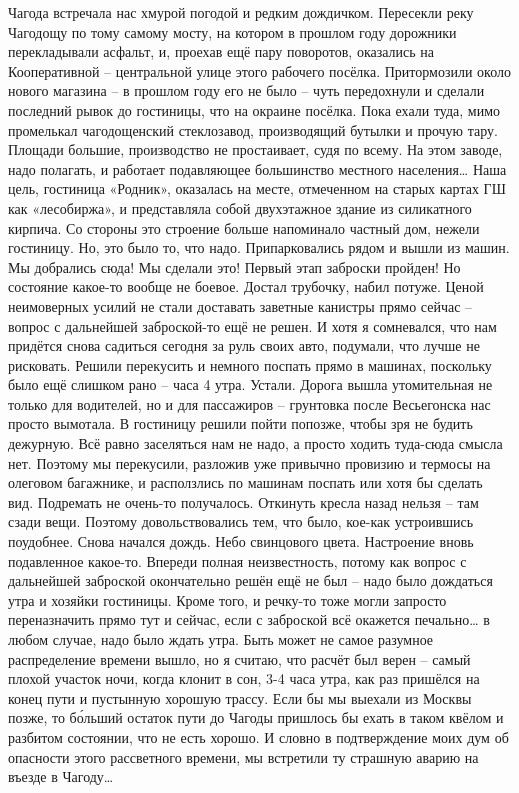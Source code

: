 Чагода встречала нас хмурой погодой и редким дождичком. Пересекли реку Чагодощу по тому самому мосту, на котором в прошлом году дорожники перекладывали асфальт, и, проехав ещё пару поворотов, оказались на Кооперативной – центральной улице этого рабочего посёлка. Притормозили около нового магазина – в прошлом году его не было – чуть передохнули и сделали последний рывок до гостиницы, что на окраине посёлка. Пока ехали туда, мимо промелькал чагодощенский стеклозавод, производящий бутылки и прочую тару. Площади большие, производство не простаивает, судя по всему. На этом заводе, надо полагать, и работает подавляющее большинство местного населения…
Наша цель, гостиница «Родник», оказалась на месте, отмеченном на старых картах ГШ как «лесобиржа», и представляла собой двухэтажное здание из силикатного кирпича. Со стороны это строение больше напоминало частный дом, нежели гостиницу. Но, это было то, что надо. Припарковались рядом и вышли из машин. Мы добрались сюда! Мы сделали это! Первый этап заброски пройден! Но состояние какое-то вообще не боевое. Достал трубочку, набил потуже. Ценой неимоверных усилий не стали доставать заветные канистры прямо сейчас – вопрос с дальнейшей заброской-то ещё не решен. И хотя я сомневался, что нам придётся снова садиться сегодня за руль своих авто, подумали, что лучше не рисковать. Решили перекусить и немного поспать прямо в машинах, поскольку было ещё слишком рано – часа 4 утра. Устали. Дорога вышла утомительная не только для водителей, но и для пассажиров – грунтовка после Весьегонска нас просто вымотала. В гостиницу решили пойти попозже, чтобы зря не будить дежурную. Всё равно заселяться нам не надо, а просто ходить туда-сюда смысла нет. Поэтому мы перекусили, разложив уже привычно провизию и термосы на олеговом багажнике, и расползлись по машинам поспать или хотя бы сделать вид. 
Подремать не очень-то получалось. Откинуть кресла назад нельзя – там сзади вещи. Поэтому довольствовались тем, что было, кое-как устроившись поудобнее. Снова начался дождь. Небо свинцового цвета. Настроение вновь подавленное какое-то. Впереди полная неизвестность, потому как вопрос с дальнейшей заброской окончательно решён ещё не был – надо было дождаться утра и хозяйки гостиницы. Кроме того, и речку-то тоже могли запросто переназначить прямо тут и сейчас, если с заброской всё окажется печально… в любом случае, надо было ждать утра. Быть может не самое разумное распределение времени вышло, но я считаю, что расчёт был верен – самый плохой участок ночи, когда клонит в сон, 3-4 часа утра, как раз пришёлся на конец пути и пустынную хорошую трассу. Если бы мы выехали из Москвы позже, то б\'{о}льший остаток пути до Чагоды пришлось бы ехать в таком квёлом и разбитом состоянии, что не есть хорошо. И словно в подтверждение моих дум об опасности этого рассветного времени, мы встретили ту страшную аварию на въезде в Чагоду… 
